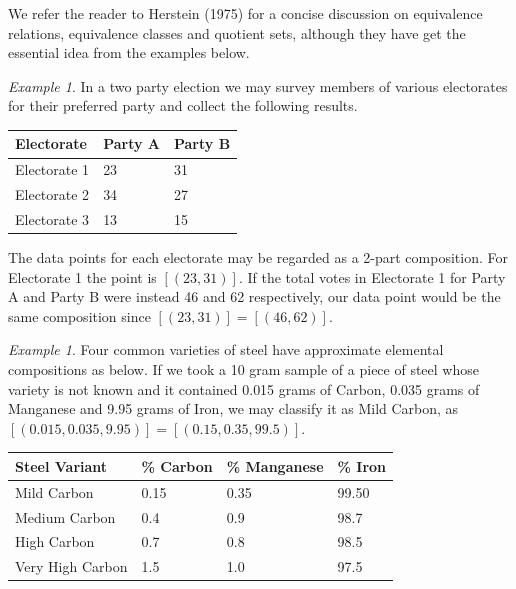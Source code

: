 \documentclass[BSc]{usydthesis}
\numberwithin{equation}{chapter}
\theoremstyle{remark}
\newtheorem{Example}[equation]{Example}
\begin{document}
We refer the reader to Herstein (1975) for a concise discussion on equivalence relations, equivalence classes and quotient sets, although they have get the essential idea from the examples below.

\begin{Example}
In a two party election we may survey members of various electorates for their preferred party and collect the following results.

\begin{table}[hbt!]
\centering
\begin{tabular}{|l|l|l|} 
\hline
Electorate   & Party A & Party B  \\ 
\hline
Electorate 1 &   23    &   31     \\
Electorate 2 &   34    &   27     \\
Electorate 3 &   13    &   15     \\
\hline
\end{tabular}
\end{table}

The data points for each electorate may be regarded as a 2-part composition. For Electorate 1 the point is $[(23,31)].$ If the total votes in Electorate 1 for Party A and Party B were instead 46 and 62 respectively, our data point would be the same composition since $[(23,31)] = [(46,62)].$ 
\end{Example}

\begin{Example}

Four common varieties of steel have approximate elemental compositions as below. If we took a 10 gram sample of a piece of steel whose variety is not known and it contained 0.015 grams of Carbon, 0.035 grams of Manganese and 9.95 grams of Iron, we may classify it as Mild Carbon, as $[(0.015, 0.035, 9.95)] = [(0.15, 0.35, 99.5)].$

\begin{table}[hbt!]
\centering
\begin{tabular}{|l|l|l|l|} 
\hline
Steel Variant    & \% Carbon & \% Manganese & \% Iron  \\ 
\hline
Mild Carbon      & 0.15      & 0.35         & 99.50    \\
Medium Carbon    & 0.4       & 0.9          & 98.7     \\
High Carbon      & 0.7       & 0.8          & 98.5     \\
Very High Carbon & 1.5       & 1.0          & 97.5     \\
\hline
\end{tabular}
\end{table}
\end{Example}
\end{document}
